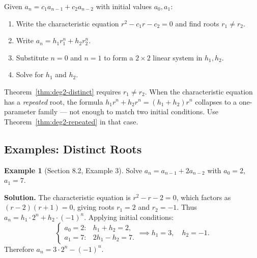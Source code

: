 \documentclass[11pt, a4paper, notitlepage]{report}
\theoremstyle{definition}
\newtheorem{example}[theorem]{Example}
\theoremstyle{remark}
\begin{document}
\begin{keyresult}[title={Solving a Degree-2 Recurrence (Distinct Roots)}]
Given $a_n = c_1 a_{n-1} + c_2 a_{n-2}$ with initial values $a_0, a_1$:
\begin{enumerate}
  \item Write the characteristic equation $r^2 - c_1 r - c_2 = 0$ and find roots $r_1 \neq r_2$.
  \item Write $a_n = h_1 r_1^n + h_2 r_2^n$.
  \item Substitute $n = 0$ and $n = 1$ to form a $2 \times 2$ linear system in $h_1, h_2$.
  \item Solve for $h_1$ and $h_2$.
\end{enumerate}
\end{keyresult}

\begin{warning}[title={Distinctness is Essential}]
Theorem~\ref{thm:deg2-distinct} requires $r_1 \neq r_2$.  When the characteristic equation
has a \emph{repeated} root, the formula $h_1 r^n + h_2 r^n = (h_1+h_2)r^n$ collapses to a
one-parameter family — not enough to match two initial conditions.  Use
Theorem~\ref{thm:deg2-repeated} in that case.
\end{warning}

\subsection{Examples: Distinct Roots}
\label{subsec:deg2-distinct-examples}

\begin{example}[Section 8.2, Example 3]
\label{ex:sec82-ex3}
Solve $a_n = a_{n-1} + 2a_{n-2}$ with $a_0 = 2$, $a_1 = 7$.

\textbf{Solution.}  The characteristic equation is $r^2 - r - 2 = 0$, which factors as
$(r-2)(r+1) = 0$, giving roots $r_1 = 2$ and $r_2 = -1$.  Thus $a_n = h_1 \cdot 2^n + h_2 \cdot (-1)^n$.
Applying initial conditions:
\[
  \begin{cases} a_0 = 2: & h_1 + h_2 = 2, \\ a_1 = 7: & 2h_1 - h_2 = 7. \end{cases}
  \implies h_1 = 3,\quad h_2 = -1.
\]
Therefore $\boxed{a_n = 3 \cdot 2^n - (-1)^n}$.
\end{example}
\end{document}
